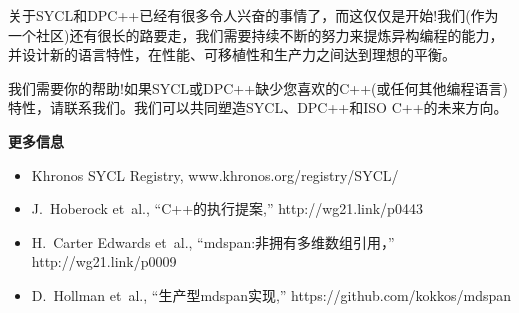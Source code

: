 
关于SYCL和DPC++已经有很多令人兴奋的事情了，而这仅仅是开始!我们(作为一个社区)还有很长的路要走，我们需要持续不断的努力来提炼异构编程的能力，并设计新的语言特性，在性能、可移植性和生产力之间达到理想的平衡。\par

我们需要你的帮助!如果SYCL或DPC++缺少您喜欢的C++(或任何其他编程语言)特性，请联系我们。我们可以共同塑造SYCL、DPC++和ISO C++的未来方向。\par

\hspace*{\fill} \par %
\textbf{更多信息}

\begin{itemize}
	\item Khronos SYCL Registry, www.khronos.org/registry/SYCL/
	\item J. Hoberock et al., “C++的执行提案,” http://wg21.link/p0443
	\item H. Carter Edwards et al., “mdspan:非拥有多维数组引用，” http://wg21.link/p0009
	\item D. Hollman et al., “生产型mdspan实现,” https://github.com/kokkos/mdspan
\end{itemize}

\newpage